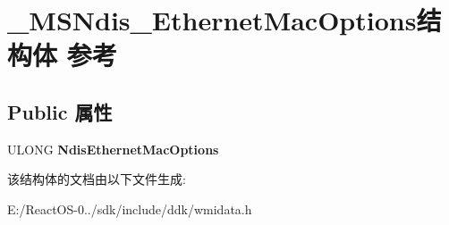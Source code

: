 \hypertarget{struct___m_s_ndis___ethernet_mac_options}{}\section{\+\_\+\+M\+S\+Ndis\+\_\+\+Ethernet\+Mac\+Options结构体 参考}
\label{struct___m_s_ndis___ethernet_mac_options}
\subsection*{Public 属性}
\begin{DoxyCompactItemize}
\item 
\mbox{\label{struct___m_s_ndis___ethernet_mac_options_ab99d3acd9e0afcc1a06d1082c43260e9}} 
U\+L\+O\+NG {\bfseries Ndis\+Ethernet\+Mac\+Options}
\end{DoxyCompactItemize}


该结构体的文档由以下文件生成\+:\begin{DoxyCompactItemize}
\item 
E\+:/\+React\+O\+S-\/0../sdk/include/ddk/wmidata.\+h\end{DoxyCompactItemize}
